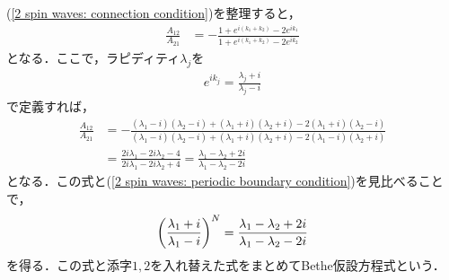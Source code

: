 \documentclass[\main/main.tex]{subfiles}
\begin{document}
\begin{frame}{}
    (\ref{2 spin waves: connection condition})を整理すると，
    \begin{align}
        \frac{A_{12}}{A_{21}} &
        = -\frac{1+e^{i(k_1+k_2)}-2e^{ik_1}}{1+e^{i(k_1+k_2)}-2e^{ik_2}}
        \label{2 spin waves: connection condition-2}
    \end{align}
    となる．ここで，ラピディティ$\lambda_j$を
    \begin{align}
        e^{ik_j} = \frac{\lambda_j + i}{\lambda_j - i}
    \end{align}
    で定義すれば，
    \begin{align}
        \frac{A_{12}}{A_{21}} &\nonumber
        = -\frac{
            (\lambda_1-i)(\lambda_2-i) + (\lambda_1+i)(\lambda_2+i) - 2(\lambda_1+i)(\lambda_2-i)
        }{
            (\lambda_1-i)(\lambda_2-i) + (\lambda_1+i)(\lambda_2+i) - 2(\lambda_1-i)(\lambda_2+i)
        }
        \\ &
        = \frac{2i\lambda_1 - 2i\lambda_2 - 4}
        {2i\lambda_1 - 2i\lambda_2 + 4}
        = \frac{\lambda_1-\lambda_2+2i}
        {\lambda_1-\lambda_2-2i}
    \end{align}
    となる．この式と(\ref{2 spin waves: periodic boundary condition})を見比べることで，
    \begin{align}
        \qty(\frac{\lambda_1+i}{\lambda_1-i})^N = \frac{\lambda_1-\lambda_2+2i}
        {\lambda_1-\lambda_2-2i}
        \label{2 spin waves: Bethe Ansatz Equation}
    \end{align}
    を得る．この式と添字$1,2$を入れ替えた式をまとめて\alert{Bethe仮設方程式}という．
\end{frame}

\end{document}
